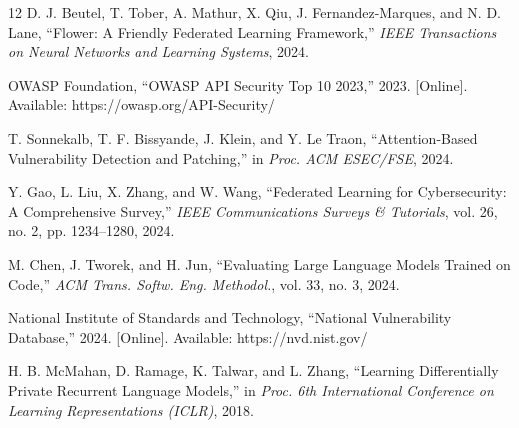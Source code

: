 \documentclass[conference]{IEEEtran}
\begin{document}
\begin{thebibliography}{12}
D. J. Beutel, T. Tober, A. Mathur, X. Qiu, J. Fernandez-Marques, and N. D. Lane, ``Flower: A Friendly Federated Learning Framework,'' \textit{IEEE Transactions on Neural Networks and Learning Systems}, 2024.

OWASP Foundation, ``OWASP API Security Top 10 2023,'' 2023. [Online]. Available: https://owasp.org/API-Security/

T. Sonnekalb, T. F. Bissyande, J. Klein, and Y. Le Traon, ``Attention-Based Vulnerability Detection and Patching,'' in \textit{Proc. ACM ESEC/FSE}, 2024.

Y. Gao, L. Liu, X. Zhang, and W. Wang, ``Federated Learning for Cybersecurity: A Comprehensive Survey,'' \textit{IEEE Communications Surveys \& Tutorials}, vol. 26, no. 2, pp. 1234--1280, 2024.

M. Chen, J. Tworek, and H. Jun, ``Evaluating Large Language Models Trained on Code,'' \textit{ACM Trans. Softw. Eng. Methodol.}, vol. 33, no. 3, 2024.

National Institute of Standards and Technology, ``National Vulnerability Database,'' 2024. [Online]. Available: https://nvd.nist.gov/

H. B. McMahan, D. Ramage, K. Talwar, and L. Zhang, ``Learning Differentially Private Recurrent Language Models,'' in \textit{Proc. 6th International Conference on Learning Representations (ICLR)}, 2018.

\end{thebibliography}
\end{document}
